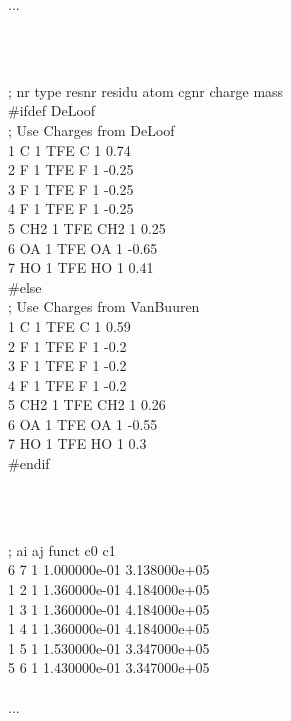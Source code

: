 {\small\begin{tt}
...\\
\end{tt}\\
\begin{tt}
[ atoms ]\\
; nr   type   resnr  residu   atom    cgnr    charge      mass\\
\#ifdef DeLoof\\
; Use Charges from DeLoof\\
   1      C      1    TFE       C       1       0.74\\
   2      F      1    TFE       F       1      -0.25\\
   3      F      1    TFE       F       1      -0.25\\
   4      F      1    TFE       F       1      -0.25\\
   5    CH2      1    TFE     CH2       1       0.25\\
   6     OA      1    TFE      OA       1      -0.65\\
   7     HO      1    TFE      HO       1       0.41\\
\#else\\
; Use Charges from VanBuuren\\
   1      C      1    TFE       C       1       0.59\\
   2      F      1    TFE       F       1      -0.2\\
   3      F      1    TFE       F       1      -0.2\\
   4      F      1    TFE       F       1      -0.2\\
   5    CH2      1    TFE     CH2       1       0.26\\
   6     OA      1    TFE      OA       1      -0.55\\
   7     HO      1    TFE      HO       1       0.3\\
\#endif\\
\end{tt}\\
\begin{tt}
[ bonds ]\\
;  ai    aj funct           c0           c1\\
    6     7     1 1.000000e-01 3.138000e+05 \\
    1     2     1 1.360000e-01 4.184000e+05 \\
    1     3     1 1.360000e-01 4.184000e+05 \\
    1     4     1 1.360000e-01 4.184000e+05 \\
    1     5     1 1.530000e-01 3.347000e+05 \\
    5     6     1 1.430000e-01 3.347000e+05 \\
\\
...\\
\end{tt}}

